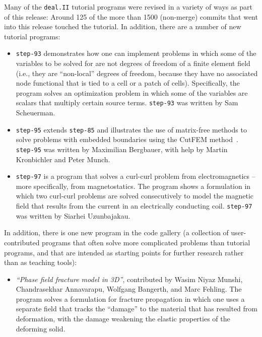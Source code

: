 \documentclass{ansarticle-preprint}
\newcommand{\specialword}[1]{\texttt{#1}}
\newcommand{\dealii}{{\specialword{deal.II}}\xspace}
\newcommand{\step}[1]{{\specialword{step-#1}}\xspace}
\begin{document}
Many of the \dealii tutorial programs were revised in a variety of ways
as part of this release: Around 125 of the more than 1500 (non-merge)
commits that went into this release touched the tutorial.
In addition, there are a number of new tutorial
programs:
\begin{itemize}
  \item
    \step{93}
    demonstrates how one can implement problems in which some of the
    variables to be solved for are not degrees of freedom of a finite
    element field (i.e., they are ``non-local'' degrees of freedom, because
    they have no associated node functional that is tied to a cell or
    a patch of cells). Specifically, the program solves an
    optimization problem in which some of the variables are scalars
    that multiply certain source terms.
    \step{93} was written by Sam Scheuerman.
  \item
    \step{95} extends \step{85} and illustrates the use of matrix-free methods to solve
    problems with embedded boundaries using the CutFEM method~\cite{bergbauer2025high}. \step{95} was written
    by Maximilian Bergbauer, with help by Martin Kronbichler and Peter Munch.
  \item
    \step{97}
    is a program that solves a curl-curl problem from electromagnetics
    -- more specifically, from magnetostatics. The program shows a
    formulation in which two curl-curl problems are solved
    consecutively to model the magnetic field that results from the
    current in an electrically conducting coil.
    \step{97} was written by Siarhei Uzunbajakau.
\end{itemize}

In addition, there is one new program in the code gallery (a collection of
user-contributed programs that often solve more complicated problems
than tutorial programs, and that are intended as starting points for further
research rather than as teaching tools):
\begin{itemize}
  \item \emph{``Phase field fracture model in 3D''},
    contributed by Wasim Niyaz Munshi,
    Chandrasekhar Annavarapu,
    Wolfgang Bangerth, and
    Marc Fehling. The program solves a formulation for fracture
    propagation in which one uses a separate field that tracks the
    ``damage'' to the material that has resulted from deformation,
    with the damage weakening the elastic properties of the deforming solid.
\end{itemize}
\end{document}
